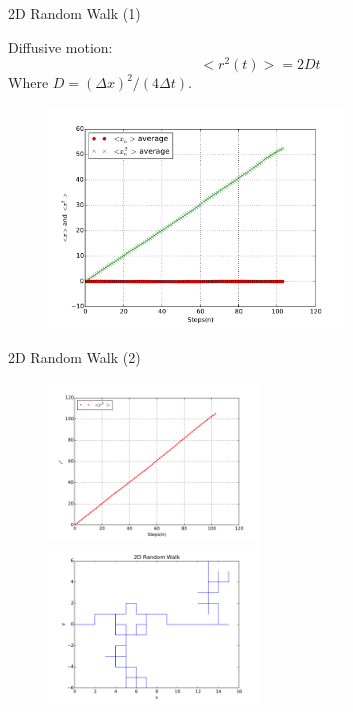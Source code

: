\documentclass{beamer}
\begin{document}
\begin{frame}{2D Random Walk (1)}

Diffusive motion:
\begin{equation}
	<r^2(t)> = 2Dt
\end{equation}
Where $D = (\Delta x)^2/(4\Delta t)$.
	
\begin{figure}[H]
	\centering
	\includegraphics[width=0.7\textwidth]{rwxn.pdf}
\end{figure}
	

\end{frame}

\begin{frame}{2D Random Walk (2)}

\begin{figure}[H]
	\centering
	\includegraphics[width=0.5\textwidth]{rwxn2.pdf}
  	\includegraphics[width=0.5\textwidth]{rwxn3.pdf}
\end{figure}
	

\end{frame}
\end{document}
